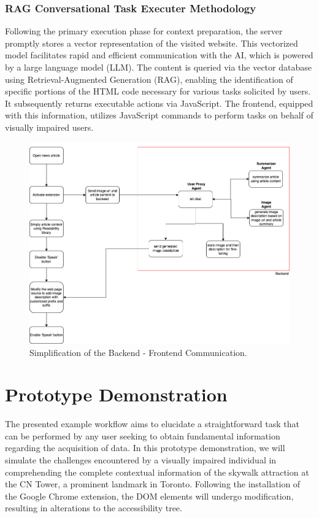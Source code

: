 \documentclass[conference]{IEEEtran}
\begin{document}
\subsubsection{RAG Conversational Task Executer Methodology}

Following the primary execution phase for context preparation, the server promptly stores a vector representation of the visited website. This vectorized model facilitates rapid and efficient communication with the AI, which is powered by a large language model (LLM). The content is queried via the vector database using Retrieval-Augmented Generation (RAG), enabling the identification of specific portions of the HTML code necessary for various tasks solicited by users. It subsequently returns executable actions via JavaScript. The frontend, equipped with this information, utilizes JavaScript commands to perform tasks on behalf of visually impaired users.


\begin{figure}[h]
\centerline{\includegraphics[width=\linewidth]{images/img1.png}}
\caption{Simplification of the Backend - Frontend Communication.}
\label{fig1}
\end{figure}

\section{Prototype Demonstration}

The presented example workflow aims to elucidate a straightforward task that can be performed by any user seeking to obtain fundamental information regarding the acquisition of data. In this prototype demonstration, we will simulate the challenges encountered by a visually impaired individual in comprehending the complete contextual information of the skywalk attraction at the CN Tower, a prominent landmark in Toronto. Following the installation of the Google Chrome extension, the DOM elements will undergo modification, resulting in alterations to the accessibility tree.
\end{document}
